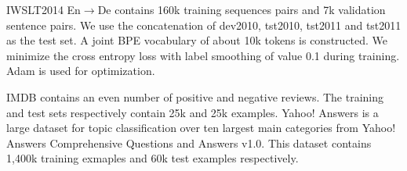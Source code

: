 \documentclass[11pt,a4paper]{article}
\begin{document}
IWSLT2014 En$\rightarrow$De contains 160k training sequences pairs and 7k validation sentence pairs. We use the concatenation of dev2010, tst2010, tst2011 and tst2011 as the test set. A joint BPE vocabulary of about 10k tokens is constructed.  
We minimize the cross entropy loss with label smoothing of value 0.1 during training.  Adam \citep{kingma2014adam} is used for optimization.

IMDB contains an even number of positive and negative reviews. The training and test sets  respectively contain 25k and 25k examples.
Yahoo! Answers is a large dataset for topic classification over ten largest main categories from Yahoo! Answers Comprehensive Questions and Answers v1.0. This dataset contains 1,400k training exmaples and 60k test examples respectively.
\end{document}
